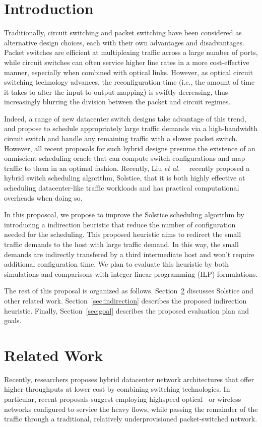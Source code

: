 \section{Introduction}

Traditionally, circuit switching and packet switching have been
considered as alternative design choices, each with their own advantages
and disadvantages. Packet switches are efficient at multiplexing traffic
across a large number of ports, while circuit switches can often service
higher line rates in a more cost-effective manner, especially when
combined with optical links. However, as optical circuit switching
technology advances, the reconfiguration time (i.e., the amount of time
it takes to alter the input-to-output mapping) is swiftly decreasing,
thus increasingly blurring the division between the packet and circuit
regimes.

Indeed, a range of new datacenter switch designs take advantage of this
trend, and propose to schedule appropriately large traffic demands via a
high-bandwidth circuit switch and handle any remaining traffic with a
slower packet switch. However, all recent proposals for such hybrid
designs presume the existence of an omniscient scheduling oracle that
can compute switch configurations and map traffic to them in an optimal
fashion. Recently, Liu \textit{et al.\ }~\cite{Liu:2014} recently
proposed a hybrid switch scheduling algorithm, Solstice, that it is both
highly effective at scheduling datacenter-like traffic workloads and has
practical computational overheads when doing so.

In this proposoal, we propose to improve the Solstice scheduling
algorithm by introducing a indirection heuristic that reduce the number
of configuration needed for the scheduling. This proposed heuristic aims
to redirect the small traffic demands to the host with large traffic
demand. In this way, the small demands are indirectly transfered by a
third intermediate host and won't require additional configuration time.
We plan to evaluate this heuristic by both simulations and comparisons
with integer linear programming (ILP) formulations.

The rest of this proposal is organized as follows.
Section~\ref{sec:related} discusses Solstice and other related work.
Section~\ref{sec:indirection} describes the proposed indirection
heuristic. Finally, Section~\ref{sec:goal} describes the proposed evaluation plan
and goals.

\section{Related Work}
\label{sec:related}
Recently, researchers proposes hybrid datacenter network architectures
that offer higher throughputs at lower cost by combining switching
technologies. In particular, recent proposals suggest employing
highspeed optical~\cite{Chen:2012, Farrington:2010, Wang:2010} or
wireless~\cite{Halperin:2011, Kandula:2009, Zhou:2012} networks
configured to service the heavy flows, while passing the remainder of
the traffic through a traditional, relatively underprovisioned
packet-switched network. 

